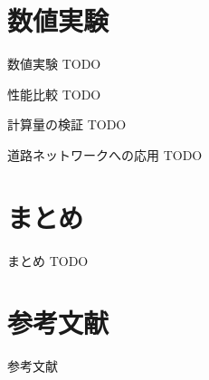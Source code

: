 \documentclass[dvipdfmx,fleqn]{beamer}
\begin{document}
\section{数値実験}
\begin{frame}{数値実験}
  \alert{TODO}
\end{frame}

\begin{frame}{性能比較}
  \alert{TODO}
\end{frame}

\begin{frame}{計算量の検証}
  \alert{TODO}
\end{frame}

\begin{frame}{道路ネットワークへの応用}
  \alert{TODO}
\end{frame}

\section{まとめ}
\begin{frame}{まとめ}
  \alert{TODO}
\end{frame}

\appendix
\section{参考文献}
\begin{frame}[allowframebreaks]{参考文献}
  \printbibliography[title=]
\end{frame}
\end{document}
